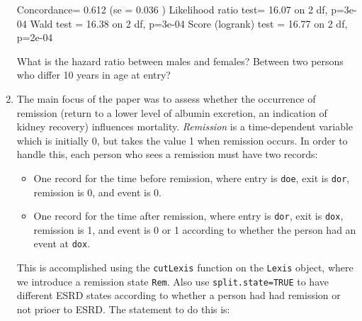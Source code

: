 \documentclass[
]{book}
\newenvironment{Shaded}{\begin{snugshade}}{\end{snugshade}}
\newcommand{\AttributeTok}[1]{\textcolor[rgb]{0.13,0.29,0.53}{#1}}
\newcommand{\CommentTok}[1]{\textcolor[rgb]{0.56,0.35,0.01}{\textit{#1}}}
\newcommand{\ConstantTok}[1]{\textcolor[rgb]{0.56,0.35,0.01}{#1}}
\newcommand{\FunctionTok}[1]{\textcolor[rgb]{0.13,0.29,0.53}{\textbf{#1}}}
\newcommand{\NormalTok}[1]{#1}
\newcommand{\OtherTok}[1]{\textcolor[rgb]{0.56,0.35,0.01}{#1}}
\newcommand{\SpecialCharTok}[1]{\textcolor[rgb]{0.81,0.36,0.00}{\textbf{#1}}}
\newcommand{\StringTok}[1]{\textcolor[rgb]{0.31,0.60,0.02}{#1}}
\providecommand{\tightlist}{%
  \setlength{\itemsep}{0pt}\setlength{\parskip}{0pt}}
\begin{document}
\begin{enumerate}
\begin{Shaded}
\begin{Highlighting}[]
\NormalTok{Concordance= 0.612  (se = 0.036 )}
\NormalTok{Likelihood ratio test= 16.07  on 2 df,   p=3e{-}04}
\NormalTok{Wald test            = 16.38  on 2 df,   p=3e{-}04}
\NormalTok{Score (logrank) test = 16.77  on 2 df,   p=2e{-}04}
\end{Highlighting}
\end{Shaded}

  What is the hazard ratio between males and females?
  Between two persons who differ 10 years in age at entry?
\item
  The main focus of the paper was to assess whether the occurrence of
  remission (return to a lower level of albumin excretion, an
  indication of kidney recovery) influences mortality.
  \emph{Remission} is a time-dependent variable which is initially 0, but
  takes the value 1 when remission occurs. In order to handle this, each
  person who sees a remission must have two records:

  \begin{itemize}
  \tightlist
  \item
    One record for the time before remission, where entry is
    \texttt{doe}, exit is \texttt{dor}, remission is 0, and event is 0.
  \item
    One record for the time after remission, where entry is
    \texttt{dor}, exit is \texttt{dox}, remission is 1, and event is 0
    or 1 according to whether the person had an event at \texttt{dox}.
  \end{itemize}

  This is accomplished using the \texttt{cutLexis} function on the
  \texttt{Lexis} object, where we introduce a remission state \texttt{Rem}.
  Also use \texttt{split.state=TRUE} to
  have different ESRD states according to whether a person had had
  remission or not prioer to ESRD. The statement to do this is:

\begin{Shaded}
\end{Shaded}


\end{enumerate}
\end{document}
